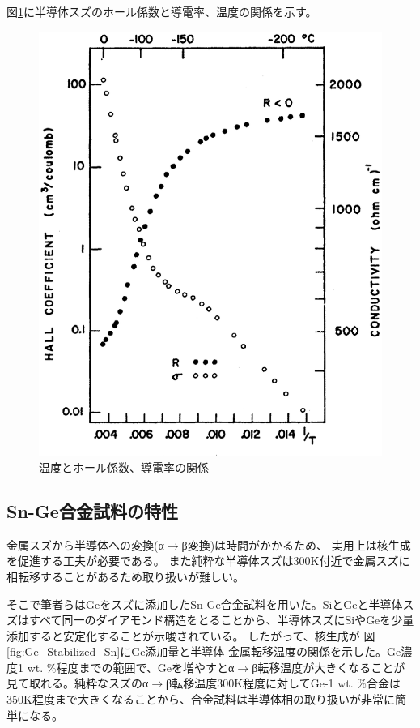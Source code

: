 図\ref{fig:conductivity}に半導体スズのホール係数と導電率、温度の関係を示す。
\begin{figure}[!h]
    \begin{center}
   \includegraphics[width=0.6\hsize]{Introduction/conductivity.eps}
  \end{center}
  \caption{温度とホール係数、導電率の関係\cite{Kohnke}}
  \label{fig:conductivity}
\end{figure}

\subsection{Sn-Ge合金試料の特性}
金属スズから半導体への変換(α$\to$β変換)は時間がかかるため、%
実用上は核生成を促進する工夫が必要である。
また純粋な半導体スズは300K付近で金属スズに相転移することがあるため取り扱いが難しい。

そこで筆者らはGeをスズに添加したSn-Ge合金試料を用いた。SiとGeと半導体スズはすべて同一のダイアモンド構造をとることから、半導体スズにSiやGeを少量添加すると安定化することが示唆されている\cite{Ewald1954,Gallerneault1983}。%
したがって、核生成が
図\ref{fig:Ge_Stabilized_Sn}にGe添加量と半導体-金属転移温度の関係を示した\cite{Vnuk1984}。Ge濃度1 wt. \%程度までの範囲で、Geを増やすとα$\to$β転移温度が大きくなることが見て取れる。純粋なスズのα$\to$β転移温度300K程度に対してGe-1 wt. \%合金は350K程度まで大きくなることから、合金試料は半導体相の取り扱いが非常に簡単になる。

